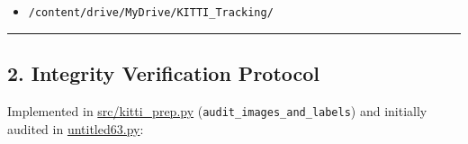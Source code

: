 \documentclass[10.5pt,a4paper]{article}
\begin{document}
\begin{itemize}[leftmargin=1.5em,itemsep=2pt]
\item \texttt{/\allowbreak{}content/\allowbreak{}drive/\allowbreak{}MyDrive/\allowbreak{}KITTI\_\allowbreak{}Tracking/\allowbreak{}}
\end{itemize}

\par\noindent\rule{\textwidth}{0.4pt}\par\medskip

\subsection{2. Integrity Verification Protocol}

Implemented in \href{https://github.com/Heisnotanimposter/Totalcare\_autonomous\_driving\_Yolov5/blob/main/src/kitti\_prep.py}{src/kitti\_prep.py} (\texttt{audit\_\allowbreak{}images\_\allowbreak{}and\_\allowbreak{}labels}) and initially audited in \href{https://github.com/Heisnotanimposter/Totalcare\_autonomous\_driving\_Yolov5/blob/main/untitled63.py}{untitled63.py}:
\end{document}
